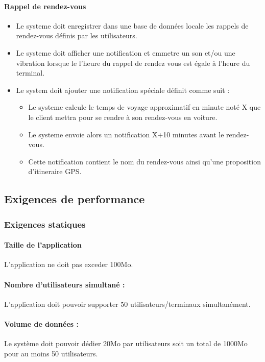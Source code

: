 \documentclass{article}
\begin{document}
\paragraph{Rappel de rendez-vous}
\begin{itemize}
\item Le systeme doit enregistrer dans une base de données locale les
  rappels de rendez-vous définis par les utilisateurs.
\item Le systeme doit afficher une notification et emmetre un son
  et/ou une vibration lorsque le l'heure du rappel de rendez vous est
  égale à l'heure du terminal.
\item Le system doit ajouter une notification spéciale définit
  comme suit :
  \begin{itemize}
    \item Le systeme calcule le temps de voyage approximatif en minute
      noté X que le
      client mettra pour se rendre à son rendez-vous en voiture.
     \item Le systeme envoie alors un notification X+10 minutes avant
       le rendez-vous.
     \item Cette notification contient le nom du rendez-vous ainsi
       qu'une proposition d'itineraire GPS.
  \end{itemize}

\end{itemize}

\subsection{Exigences de performance}
\subsubsection{Exigences statiques}
\paragraph{Taille de l'application}
L'application ne doit pas exceder 100Mo.
\paragraph{Nombre d'utilisateurs simultané :}
L'application doit pouvoir supporter 50 utilisateurs/terminaux
simultanément.
\paragraph{Volume de données :}
Le système doit pouvoir dédier 20Mo par utilisateurs soit un total de
1000Mo pour au moins 50 utilisateurs.
\end{document}
